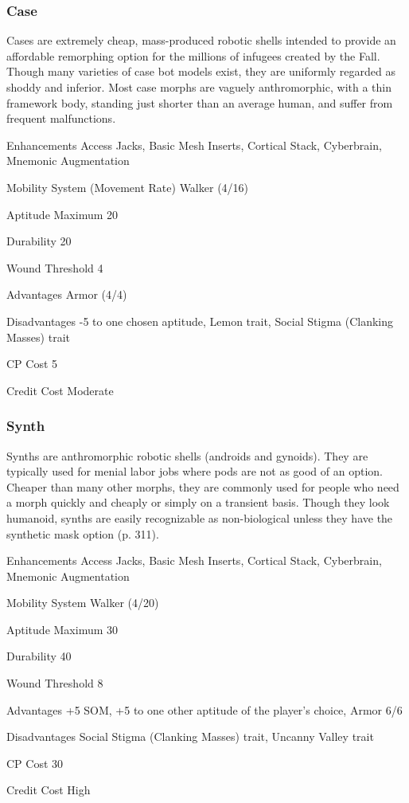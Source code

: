 \subsubsection{Case} \label{sec:starting-case} 

Cases are extremely cheap, mass-produced robotic shells intended to provide an affordable remorphing option for the millions of infugees created by the Fall. Though many varieties of case bot models exist, they are uniformly regarded as shoddy and inferior. Most case morphs are vaguely anthromorphic, with a thin framework body, standing just shorter than an average human, and suffer from frequent malfunctions. 

\begin{description*} \item[Enhancements] Access Jacks, Basic Mesh Inserts, Cortical Stack, Cyberbrain, Mnemonic Augmentation \item[Mobility System] (Movement Rate) Walker (4/16) \item[Aptitude Maximum] 20 \item[Durability] 20 \item[Wound Threshold] 4 \item[Advantages] Armor (4/4) \item[Disadvantages] -5 to one chosen aptitude, Lemon trait, Social Stigma (Clanking Masses) trait \item[CP Cost] 5 \item[Credit Cost] Moderate \end{description*} 

\subsubsection{Synth} \label{sec:starting-synths} 

Synths are anthromorphic robotic shells (androids and gynoids). They are typically used for menial labor jobs where pods are not as good of an option. Cheaper than many other morphs, they are commonly used for people who need a morph quickly and cheaply or simply on a transient basis. Though they look humanoid, synths are easily recognizable as non-biological unless they have the synthetic mask option (p. 311). 

\begin{description*} \item[Enhancements] Access Jacks, Basic Mesh Inserts, Cortical Stack, Cyberbrain, Mnemonic Augmentation \item[Mobility System] Walker (4/20) \item[Aptitude Maximum] 30 \item[Durability] 40 \item[Wound Threshold] 8 \item[Advantages] +5 SOM, +5 to one other aptitude of the player’s choice, Armor 6/6 \item[Disadvantages] Social Stigma (Clanking Masses) trait, Uncanny Valley trait \item[CP Cost] 30 \item[Credit Cost] High \end{description*} 

